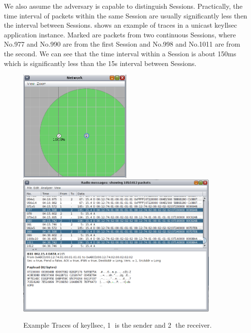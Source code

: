 We also assume the adversary is capable to distinguish Sessions. Practically, the time interval of packets within the same Session are usually significantly less then the interval between Sessions.  shows an example of traces in a unicast keyllsec application instance. Marked are packets from two continuous Sessions, where No.977 and No.990 are from the first Session and No.998 and No.1011 are from the second. We can see that the time interval within a Session is about 150ms which is significantly less than the 15s interval between Sessions.

\begin{figure}[h!]
	\center
	\includegraphics[width=0.5\textwidth]{fig/unicast_keyllsec.png}
	\\
	\includegraphics[width=0.9\textwidth]{fig/trace_keyllsec.png}
	\caption{
		Example Traces of keyllsec, \textcircled{1} is the sender and \textcircled{2} the receiver.
	}
	\label{Fig: Example Traces of keyllsec}
\end{figure}


